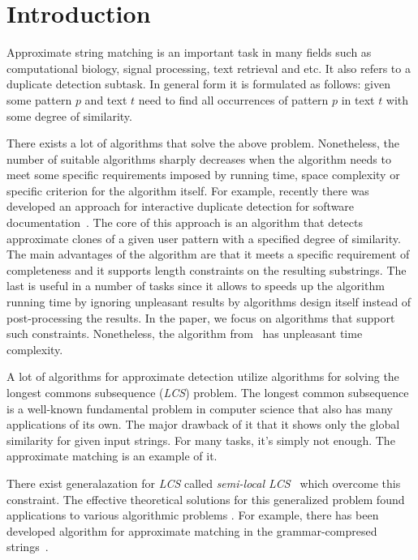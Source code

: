 \section{Introduction}
Approximate string matching is an important task in many fields such as computational biology, signal processing, text retrieval and etc.
It also refers to a duplicate detection subtask.
In general form it is formulated as follows: given some pattern $p$ and text $t$ need to find all occurrences of pattern $p$ in text $t$ with some degree of similarity.

There exists a lot of algorithms that solve the above problem.
Nonetheless, the number of suitable algorithms sharply decreases when the algorithm needs to meet some specific requirements imposed by running time, space complexity or specific criterion for the algorithm itself.
For example, recently there was developed an approach for interactive duplicate detection for software documentation~\cite{luciv2019interactive}.
The core of this approach is an algorithm that detects approximate clones of a given user pattern with a specified degree of similarity.
The main advantages of the algorithm are that it meets a specific requirement of completeness and it supports length constraints on the resulting substrings.
The last is useful in a number of tasks since it allows to speeds up the algorithm running time by ignoring unpleasant results by algorithms design itself instead of post-processing the results.
In the paper, we focus on algorithms that support such constraints.
Nonetheless, the algorithm from~\cite{luciv2019interactive} has unpleasant time complexity.

A lot of algorithms for approximate detection utilize algorithms for solving the longest commons subsequence (\emph{LCS}) problem.
The longest common subsequence is a well-known fundamental problem in computer science that also has many applications of its own.
The major drawback of it that it shows only the global similarity for given input strings.
For many tasks, it's simply not enough.
The approximate matching is an example of it.

There exist generalazation for \emph{LCS} called \emph{semi-local LCS}~\cite{} which overcome this constraint. 
The effective theoretical solutions for this generalized problem found applications to various algorithmic problems .
For example, there has been developed algorithm for approximate matching in the grammar-compresed strings~\cite{.}.

